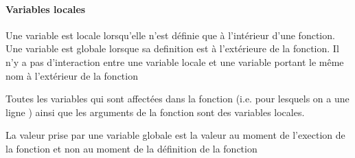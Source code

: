 \documentclass[letterpaper,10pt,english]{sphinxhowto}
\begin{document}
\paragraph{Variables locales}
\label{\detokenize{cours1_fonctions_cours:variables-locales}}
\sphinxAtStartPar
Une variable est locale lorsqu’elle n’est définie que à l’intérieur d’une fonction. Une variable est globale lorsque sa definition est à l’extérieure de la fonction. Il n’y a pas d’interaction entre une variable locale et une variable portant le même nom à l’extérieur de la fonction

\sphinxAtStartPar
Toutes les variables qui sont affectées dans la fonction (i.e. pour lesquels on a une ligne ) ainsi que les arguments de la fonction sont des variables locales.

\begin{sphinxVerbatim}[commandchars=\\\{\}]
  
  
    
\end{sphinxVerbatim}

\begin{sphinxVerbatim}[commandchars=\\\{\}]
  
  
      
    
\end{sphinxVerbatim}

\sphinxAtStartPar
La valeur prise par une variable globale est la valeur au moment de l’exection de la fonction et non au moment de la définition de la fonction

\begin{sphinxVerbatim}[commandchars=\\\{\}]
  
 
     

  
 
     

\end{sphinxVerbatim}
\end{document}
